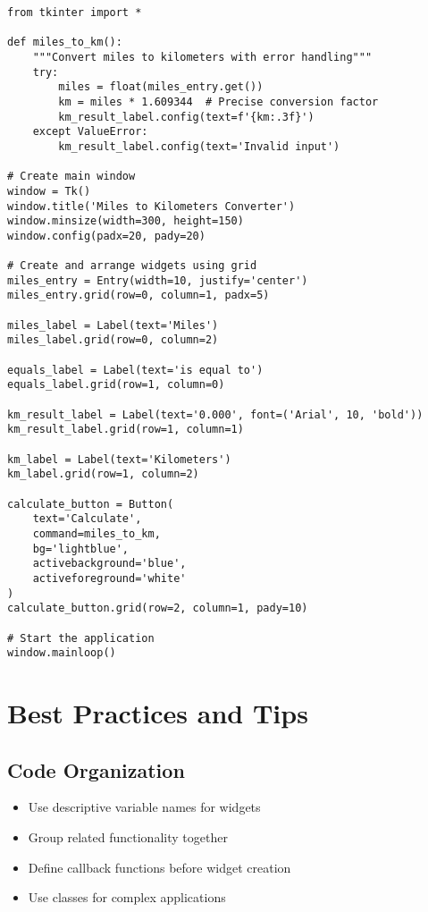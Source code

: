 \documentclass[12pt,a4paper]{article}
\begin{document}
\begin{tcolorbox}[colback=gray!5!white,colframe=gray!75!black,title=Complete Application Example]
\begin{lstlisting}
from tkinter import *

def miles_to_km():
    """Convert miles to kilometers with error handling"""
    try:
        miles = float(miles_entry.get())
        km = miles * 1.609344  # Precise conversion factor
        km_result_label.config(text=f'{km:.3f}')
    except ValueError:
        km_result_label.config(text='Invalid input')

# Create main window
window = Tk()
window.title('Miles to Kilometers Converter')
window.minsize(width=300, height=150)
window.config(padx=20, pady=20)

# Create and arrange widgets using grid
miles_entry = Entry(width=10, justify='center')
miles_entry.grid(row=0, column=1, padx=5)

miles_label = Label(text='Miles')
miles_label.grid(row=0, column=2)

equals_label = Label(text='is equal to')
equals_label.grid(row=1, column=0)

km_result_label = Label(text='0.000', font=('Arial', 10, 'bold'))
km_result_label.grid(row=1, column=1)

km_label = Label(text='Kilometers')
km_label.grid(row=1, column=2)

calculate_button = Button(
    text='Calculate',
    command=miles_to_km,
    bg='lightblue',
    activebackground='blue',
    activeforeground='white'
)
calculate_button.grid(row=2, column=1, pady=10)

# Start the application
window.mainloop()
\end{lstlisting}
\end{tcolorbox}

\section{Best Practices and Tips}

\subsection{Code Organization}
\begin{itemize}
    \item Use descriptive variable names for widgets
    \item Group related functionality together
    \item Define callback functions before widget creation
    \item Use classes for complex applications
\end{itemize}
\end{document}
